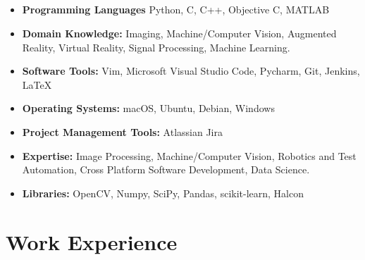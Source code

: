 \documentclass{article}
\begin{document}
\subsection{}
\begin{itemize}[label={}]
  \itemsep0em 
  \item\textbf{Programming Languages} Python, C, C++, Objective C, MATLAB
  \item\textbf{Domain Knowledge:} Imaging, Machine/Computer Vision, Augmented Reality,
    Virtual Reality, Signal Processing, Machine Learning.
  \item\textbf{Software Tools:} Vim, Microsoft Visual Studio Code, Pycharm,
    Git, Jenkins, LaTeX
  \item\textbf{Operating Systems:} macOS, Ubuntu, Debian, Windows
  \item\textbf{Project Management Tools:} Atlassian Jira
  \item\textbf{Expertise:} Image Processing, Machine/Computer Vision, Robotics and Test Automation, Cross Platform Software Development, Data Science.
  \item\textbf{Libraries:} OpenCV, Numpy, SciPy, Pandas, scikit-learn, Halcon
\end{itemize}

\subsection{}

\section{Work Experience}
\end{document}
